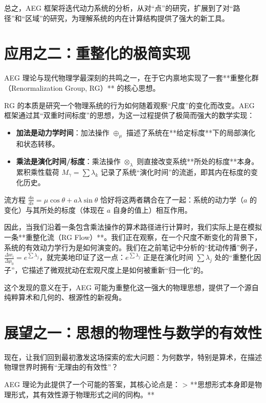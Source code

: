 \documentclass[a4paper,12pt]{book}
\numberwithin{problem}{section}
\numberwithin{definition}{section}
\numberwithin{lemma}{section}
\numberwithin{proposition}{section}
\numberwithin{theorem}{section}
\numberwithin{grammar}{section}
\numberwithin{program}{section}
\numberwithin{convention}{section}
\numberwithin{corollary}{section}
\begin{document}
总之，AEG 框架将迭代动力系统的分析，从对“点”的研究，扩展到了对“路径”和“区域”的研究，为理解系统的内在计算结构提供了强大的新工具。

\section{应用之二：重整化的极简实现}
\label{sec:app_renormalization}

AEG 理论与现代物理学最深刻的共鸣之一，在于它内禀地实现了一套**重整化群（Renormalization Group, RG）** 的核心思想。

RG 的本质是研究一个物理系统的行为如何随着观察“尺度”的变化而改变。AEG 框架通过其“双重时间标度”的思想，为这一过程提供了极简而强大的数学实现：
\begin{itemize}
    \item \textbf{加法是动力学时间}：加法操作 $\oplus_\mu$ 描述了系统在**给定标度**下的局部演化和状态转移。
    \item \textbf{乘法是演化时间/标度}：乘法操作 $\otimes_\lambda$ 则直接改变系统**所处的标度**本身。累积乘性载荷 $M_\gamma = \sum \lambda_k$ 记录了系统“演化时间”的流逝，即其内在标度的变化历史。
\end{itemize}
流方程 $\frac{da}{ds} = \mu \cos\theta + a\lambda \sin\theta$ 恰好将这两者耦合在了一起：系统的动力学（$a$ 的变化）与其所处的标度（体现在 $a$ 自身的值上）相互作用。

因此，当我们沿着一条包含乘法操作的算术路径进行计算时，我们实际上是在模拟一条**重整化流（RG Flow）**。我们正在观察，在一个尺度不断变化的背景下，系统的有效动力学行为是如何演变的。我们在之前笔记中分析的“扰动传播”例子，$\frac{\Delta w_i}{\Delta \mu_0} = e^{\sum \lambda_j}$，就完美地印证了这一点：$e^{\sum \lambda_j}$ 正是在演化时间 $\sum \lambda_j$ 处的“重整化因子”，它描述了微观扰动在宏观尺度上是如何被重新“归一化”的。

这个发现的意义在于，AEG 可能为重整化这一强大的物理思想，提供了一个源自纯粹算术和几何的、根源性的新视角。

\section{展望之一：思想的物理性与数学的有效性}
\label{sec:outlook_philosophy}

现在，让我们回到最初激发这场探索的宏大问题：为何数学，特别是算术，在描述物理世界时拥有“无理由的有效性”？

AEG 理论为此提供了一个可能的答案，其核心论点是：
> **思想形式本身即是物理形式，其有效性源于物理形式之间的同构。**
\end{document}
